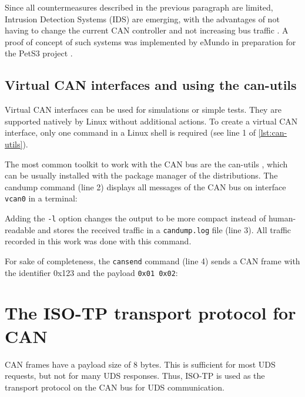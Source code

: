 Since all countermeasures described in the previous paragraph are limited, Intrusion Detection Systems (IDS) are emerging, with the advantages of not having to change the current CAN controller and not increasing bus traffic \cite{Bozdal2020}. A proof of concept of such systems was implemented by eMundo in preparation for the PetS3 project \cite{spahn2018}.

\subsection{Virtual CAN interfaces and using the can-utils}
\label{subsubsec:can-utils}

Virtual CAN interfaces can be used for simulations or simple tests. They are supported natively by Linux without additional actions.
To create a virtual CAN interface, only one command in a Linux shell is required (see line 1 of \autoref{lst:can-utils}).


The most common toolkit to work with the CAN bus are the can-utils \cite{can-utils}, which can be usually installed with the package manager of the distributions. The candump command (line 2) displays all messages of the CAN bus on interface \texttt{vcan0} in a terminal:

Adding the \texttt{-l} option changes the output to be more compact instead of human-readable and stores the received traffic in a \texttt{candump.log} file (line 3). All traffic recorded in this work was done with this command.

For sake of completeness, the \texttt{cansend} command (line 4) sends a CAN frame with the identifier 0x123 and the payload \texttt{0x01 0x02}:

\section{The ISO-TP transport protocol for CAN}

CAN frames have a payload size of 8 bytes. This is sufficient for most UDS requests, but not for many UDS responses. Thus, ISO-TP is used as the transport protocol on the CAN bus for UDS communication.

